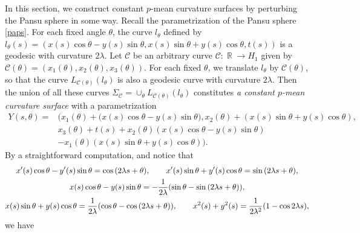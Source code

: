 \documentclass[pdftex]{sigma}
\numberwithin{equation}{section}
\DeclareMathOperator{\R}{\mathbb R}
\begin{document}
In this section, we construct constant $p$-mean curvature
surfaces by perturbing the Pansu sphere in some way. Recall the
parametrization of the Pansu sphere \eqref{paps}. For each fixed angle $
\theta$, the curve $l_{\theta}$ defined by $l_{\theta}(s)=(x(s)\cos{\theta}
-y(s)\sin{\theta},x(s)\sin{\theta}+y(s)\cos{\theta},t(s))$ is a geodesic
with curvature $2\lambda$. Let $\mathcal{C}$ be an arbitrary curve $\mathcal{
C}\colon\R \rightarrow H_{1}$ given by $\mathcal{C}(\theta)=(x_{1}(\theta),x_{2}(
\theta),x_{3}(\theta))$. For each fixed $\theta$, we translate $l_{\theta}$
by $\mathcal{C}(\theta)$, so that the curve $L_{\mathcal{C}
(\theta)}(l_{\theta})$ is also a geodesic curve with curvature $2\lambda$.
Then the union of all these curves
$
\Sigma_{\mathcal{C}}=\cup_{\theta}L_{\mathcal{C}(\theta)}(l_{\theta})
$
constitutes \emph{a constant $p$-mean curvature surface} with a
parametrization
\begin{align}
Y(s,\theta)={}&(x_{1}(\theta)+(x(s)\cos{\theta}-y(s)\sin{\theta}\bigr)
,x_{2}(\theta)+(x(s)\sin{\theta}+y(s)\cos{\theta}),\nonumber \\
&x_{3}(\theta)+t(s)+x_{2}(\theta)(x(s)\cos{\theta}-y(s)\sin{\theta})\nonumber\\
&-x_{1}(\theta)(x(s)\sin{\theta}+y(s)\cos{\theta})).\label{pacms}
\end{align}
By a straightforward computation, and notice that
\begin{gather*}
x^{\prime }(s)\cos{\theta}-y^{\prime }(s)\sin{\theta}=\cos{(2\lambda
s+\theta)}, \qquad
x^{\prime }(s)\sin{\theta}+y^{\prime }(s)\cos{\theta}=\sin{(2\lambda
s+\theta)}, \\
x(s)\cos{\theta}-y(s)\sin{\theta}=-\frac{1}{2\lambda}(\sin{\theta}-\sin{%
(2\lambda s+\theta)}), \\
x(s)\sin{\theta}+y(s)\cos{\theta}=\frac{1}{2\lambda}(\cos{\theta}-\cos{%
(2\lambda s+\theta)}), \qquad
x^2(s)+y^2(s)=\frac{1}{2\lambda^2}(1-\cos{2\lambda s}),
\end{gather*}
we have
\end{document}
